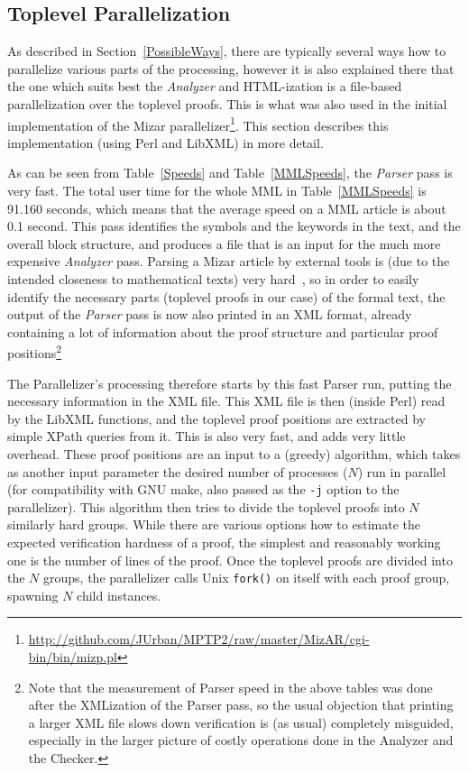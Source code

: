 \documentclass{llncs}
\begin{document}
\subsection{Toplevel Parallelization}
As described in Section~\ref{PossibleWays}, there are typically
several ways how to parallelize various parts of the processing,
however it is also explained there that the one which suits best the
\emph{Analyzer} and HTML-ization is a file-based parallelization over
the toplevel proofs. This is what was also used in the initial
implementation of the Mizar
parallelizer\footnote{\url{http://github.com/JUrban/MPTP2/raw/master/MizAR/cgi-bin/bin/mizp.pl}}. This
section describes this implementation (using Perl and LibXML) in more
detail.

As can be seen from Table~\ref{Speeds} and Table~\ref{MMLSpeeds}, the
\emph{Parser} pass is very fast. The total user time for the whole MML
in Table~\ref{MMLSpeeds} is 91.160 seconds, which means that the
average speed on a MML article is about 0.1 second. This pass
identifies the symbols and the keywords in the text, and the overall
block structure, and produces a file that is an input for the much
more expensive \emph{Analyzer} pass. Parsing a Mizar article by
external tools is (due to the intended closeness to mathematical
texts) very hard~\cite{CairnsG04}, so in order to easily identify the
necessary parts (toplevel proofs in our case) of the formal text, the
output of the \emph{Parser} pass is now also printed in an XML format,
already containing a lot of information about the proof structure and
particular proof positions\footnote{Note that the measurement of
  Parser speed in the above tables was done after the XMLization of
  the Parser pass, so the usual objection that printing a larger XML
  file slows down verification is (as usual) completely misguided,
  especially in the larger picture of costly operations done in the
  Analyzer and the Checker.}

The Parallelizer's processing therefore starts by this fast Parser
run, putting the necessary information in the XML file.  This XML file
is then (inside Perl) read by the LibXML functions, and the toplevel
proof positions are extracted by simple XPath queries from it. This is
also very fast, and adds very little overhead.  These proof positions
are an input to a (greedy) algorithm, which takes as another input
parameter the desired number of processes ($N$) run in parallel (for
compatibility with GNU make, also passed as the {\tt -j} option to the
parallelizer). This algorithm then tries to divide the toplevel proofs
into $N$ similarly hard groups. While there are various options how to
estimate the expected verification hardness of a proof, the simplest
and reasonably working one is the number of lines of the proof. Once
the toplevel proofs are divided into the $N$ groups, the parallelizer
calls Unix {\tt fork()} on itself with each proof group, spawning $N$
child instances.
\end{document}
